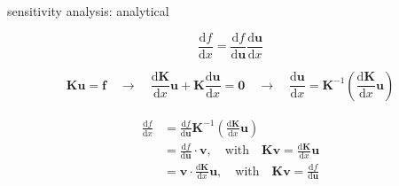 \documentclass[aspectratio=169]{beamer}
\begin{document}
\begin{frame}{sensitivity analysis: analytical}




\begin{equation*}
    \frac{\text{d} f}{\text{d} x} = \frac{\text{d} f}{\text{d} \mathbf{u}}\frac{\text{d}\mathbf{u}}{\text{d} x}
\end{equation*}
\pause

\begin{equation*}
    \mathbf{K}\mathbf{u} = \mathbf{f} \quad \rightarrow \quad \frac{\text{d}\mathbf{K}}{\text{d} x}\mathbf{u} + \mathbf{K}\frac{\text{d} \mathbf{u}}{\text{d}x}=\mathbf{0}\quad \rightarrow \quad \frac{\text{d} \mathbf{u}}{\text{d}x} = \mathbf{K}^{-1}\left(\frac{\text{d}\mathbf{K}}{\text{d} x}\mathbf{u}\right)
\end{equation*}

\pause
\begin{align*}
\begin{aligned}
    \frac{\text{d} f}{\text{d} x} &= \frac{\text{d} f}{\text{d} \mathbf{u}}\mathbf{K}^{-1}\left(\frac{\text{d}\mathbf{K}}{\text{d} x}\mathbf{u}\right)\\
    &=  \frac{\text{d} f}{\text{d} \mathbf{u}} \cdot \mathbf{v},  \quad \text{with} \quad \mathbf{K}\mathbf{v} = \frac{\text{d}\mathbf{K}}{\text{d} x}\mathbf{u}\\
    & = \mathbf{v} \cdot \frac{\text{d}\mathbf{K}}{\text{d} x}\mathbf{u},  \quad \text{with} \quad \mathbf{K}\mathbf{v} = \frac{\text{d} f}{\text{d} \mathbf{u}}
\end{aligned}
\end{align*}
    
\end{frame}
\end{document}
